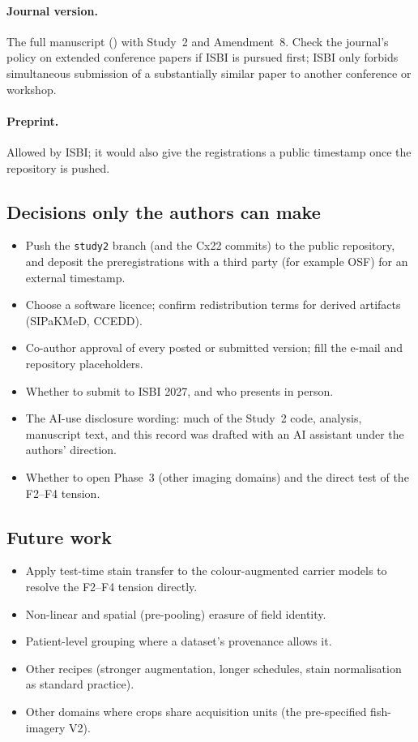 \paragraph{Journal version.} The full manuscript () with Study~2 and Amendment~8. Check the journal's
policy on extended conference papers if ISBI is pursued first; ISBI only forbids simultaneous submission of a substantially
similar paper to another conference or workshop.

\paragraph{Preprint.} Allowed by ISBI; it would also give the registrations a public timestamp once the repository is pushed.

\subsection{Decisions only the authors can make}

\begin{itemize}[leftmargin=1.6em]
\item Push the \texttt{study2} branch (and the Cx22 commits) to the public repository, and deposit the preregistrations with
a third party (for example OSF) for an external timestamp.
\item Choose a software licence; confirm redistribution terms for derived artifacts (SIPaKMeD, CCEDD).
\item Co-author approval of every posted or submitted version; fill the e-mail and repository placeholders.
\item Whether to submit to ISBI 2027, and who presents in person.
\item The AI-use disclosure wording: much of the Study~2 code, analysis, manuscript text, and this record was drafted with
an AI assistant under the authors' direction.
\item Whether to open Phase~3 (other imaging domains) and the direct test of the F2--F4 tension.
\end{itemize}

\subsection{Future work}

\begin{itemize}[leftmargin=1.6em]
\item Apply test-time stain transfer to the colour-augmented carrier models to resolve the F2--F4 tension directly.
\item Non-linear and spatial (pre-pooling) erasure of field identity.
\item Patient-level grouping where a dataset's provenance allows it.
\item Other recipes (stronger augmentation, longer schedules, stain normalisation as standard practice).
\item Other domains where crops share acquisition units (the pre-specified fish-imagery V2).
\end{itemize}
